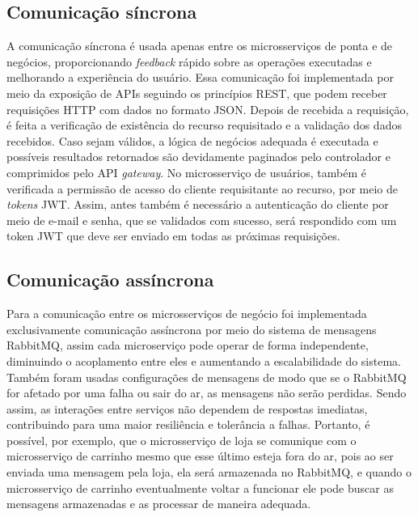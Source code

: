 \subsection*{Comunicação síncrona}
A comunicação síncrona é usada apenas entre os microsserviços de ponta e de negócios, proporcionando \emph{feedback} rápido sobre as operações executadas e melhorando a experiência do usuário. 
Essa comunicação foi implementada por meio da exposição de APIs seguindo os princípios REST, que podem receber requisições HTTP com dados no formato JSON. Depois de recebida a requisição, é feita a verificação de existência do recurso requisitado e a validação dos dados recebidos. Caso sejam válidos, a lógica de negócios adequada é executada e possíveis resultados retornados são devidamente paginados pelo controlador e comprimidos pelo API \emph{gateway}. No microsserviço de usuários, também é verificada a permissão de acesso do cliente requisitante ao recurso, por meio de \emph{tokens} JWT. Assim, antes também é necessário a autenticação do cliente por meio de e-mail e senha, que se validados com sucesso, será respondido com um token JWT que deve ser enviado em todas as próximas requisições.




\subsection*{Comunicação assíncrona}
Para a comunicação entre os microsserviços de negócio foi implementada exclusivamente comunicação assíncrona por meio do sistema de mensagens RabbitMQ, assim cada microserviço pode operar de forma independente, diminuindo o acoplamento entre eles e aumentando a escalabilidade do sistema.
Também foram usadas configurações de mensagens de modo que se o RabbitMQ for afetado por uma falha ou sair do ar, as mensagens não serão perdidas.
Sendo assim, as interações entre serviços não dependem de respostas imediatas, contribuindo para uma maior resiliência e tolerância a falhas. Portanto, é possível, por exemplo, que o microsserviço de loja se comunique com o microsserviço de carrinho mesmo que esse último esteja fora do ar, pois ao ser enviada uma mensagem pela loja, ela será armazenada no RabbitMQ, e quando o microsserviço de carrinho eventualmente voltar a funcionar ele pode buscar as mensagens armazenadas e as processar de maneira adequada. 

